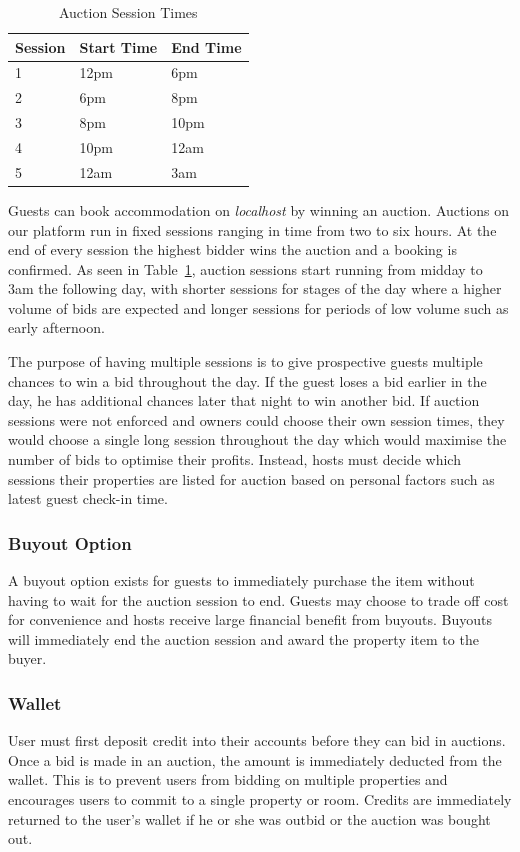 \begin{table}[!h]
  \centering
  \begin{tabular}{|l|l|l|}
    \hline
    Session & Start Time & End Time \\ \hline
    1       & 12pm       & 6pm      \\
    2       & 6pm        & 8pm      \\
    3       & 8pm        & 10pm     \\
    4       & 10pm       & 12am     \\
    5       & 12am       & 3am      \\ \hline
  \end{tabular}
  \caption{Auction Session Times}
  \label{tab:sessionTimes}
\end{table}

Guests can book accommodation on \emph{localhost} by winning an auction.
Auctions on our platform run in fixed sessions ranging in time from two to six hours.
At the end of every session the highest bidder wins the auction and a booking is confirmed.
As seen in Table~\ref{tab:sessionTimes},
auction sessions start running from midday to 3am the following day, with shorter sessions
for stages of the day where a higher volume of bids are expected and longer sessions
for periods of low volume such as early afternoon.

The purpose of having multiple sessions is to give prospective guests multiple chances to
win a bid throughout the day. If the guest loses a bid earlier in the day, he has
additional chances later that night to win another bid. If auction
sessions were not enforced and owners could choose their own session times, they
would choose a single long session throughout the day which would
maximise the number of bids to optimise their profits.
Instead, hosts must decide which sessions their properties are listed for auction
based on personal factors such as latest guest check-in time.

\subsubsection{Buyout Option}
A buyout option exists for guests to immediately purchase
the item without having to wait for the auction session to end. Guests may choose to
trade off cost for convenience and hosts receive large financial benefit from buyouts.
Buyouts will immediately end the auction session and award the property item to the buyer.

\subsubsection{Wallet}
User must first deposit credit into their accounts before they can bid in auctions.
Once a bid is made in
an auction, the amount is immediately deducted from the wallet. This is to prevent
users from bidding on multiple properties and encourages users to commit to a single
property or room. Credits are immediately returned to the user's wallet if
he or she was outbid or the auction was bought out.
